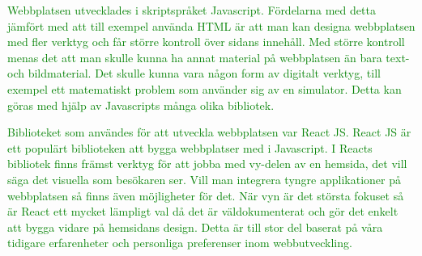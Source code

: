 \textcolor{green}{Webbplatsen utvecklades i skriptspråket Javascript. Fördelarna med detta jämfört med att till exempel använda HTML är att man kan designa webbplatsen med fler verktyg och får större kontroll över sidans innehåll. Med större kontroll menas det att man skulle kunna ha annat material på webbplatsen än bara text- och bildmaterial. Det skulle kunna vara någon form av digitalt verktyg, till exempel ett matematiskt problem som använder sig av en simulator. Detta kan göras med hjälp av Javascripts många olika bibliotek.}

\textcolor{green}{Biblioteket som användes för att utveckla webbplatsen var React JS. React JS är ett populärt biblioteken att bygga webbplatser med i Javascript. I Reacts bibliotek finns främst verktyg för att jobba med vy-delen av en hemsida, det vill säga det visuella som besökaren ser. Vill man integrera tyngre applikationer på webbplatsen så finns även möjligheter för det. När vyn är det största fokuset så är React ett mycket lämpligt val då det är väldokumenterat och gör det enkelt att bygga vidare på hemsidans design. Detta är till stor del baserat på våra tidigare erfarenheter och personliga preferenser inom webbutveckling.}